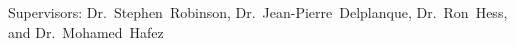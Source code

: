 \documentclass[letterpaper,MMMyyyy,nonstop]{simpleresumecv}
\begin{document}
\begin{body}
\begin{detail}
\SubItem
Supervisors:
Dr.~Stephen~Robinson,
Dr.~Jean-Pierre~Delplanque,
Dr.~Ron~Hess, and
Dr.~Mohamed~Hafez


\end{detail}











\end{body}
\end{document}
